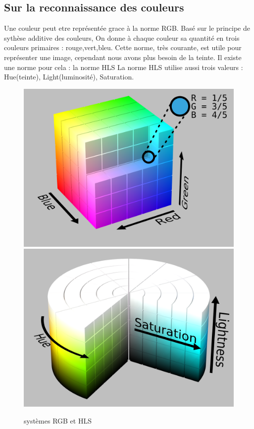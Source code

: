 \documentclass[11pt,a4paper]{article}
\begin{document}
	\subsection{Sur la reconnaissance des couleurs}
    Une couleur peut etre représentée grace à la norme RGB. Basé sur le principe de sythèse additive des couleurs,
On donne à chaque couleur sa quantité en trois couleurs primaires : rouge,vert,bleu. Cette norme, très courante, est
utile pour représenter une image, cependant nous avons plus besoin de la teinte. Il existe une norme pour cela : la norme HLS
La norme HLS utilise aussi trois valeurs : Hue(teinte), Light(luminosité), Saturation.

\begin{figure}[h]
	\centering
	\includegraphics[scale=0.1]{RGB_Cube_Show_lowgamma_cutout_b}
	\includegraphics[scale=0.1]{HSL_color_solid_cylinder_alpha_lowgamma}
	\caption{systèmes RGB et HLS}
\end{figure}
\end{document}
